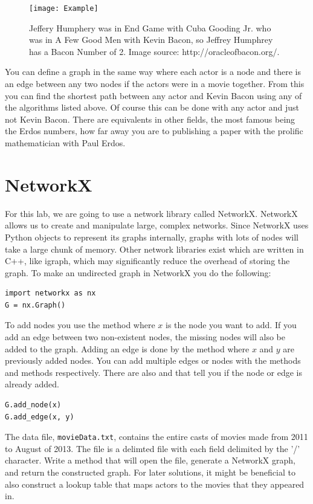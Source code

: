 \begin{figure}[h]
\texttt{[image: Example]}
\caption{Jeffery Humphery was in End Game with Cuba Gooding Jr. who was in A Few Good Men with Kevin Bacon, so Jeffrey Humphrey has a Bacon Number of 2.  Image source: http://oracleofbacon.org/.}
\end{figure}

You can define a graph in the same way where each actor is a node and there is an edge between any two nodes if the actors were in a movie together. From this you can find the shortest path between any actor and Kevin Bacon using any of the algorithms listed above. Of course this can be done with any actor and just not Kevin Bacon. There are equivalents in other fields, the most famous being the Erdos numbers, how far away you are to publishing a paper with the prolific mathematician with Paul Erdos.

\section*{NetworkX}
For this lab, we are going to use a network library called NetworkX. NetworkX allows us to create and manipulate large, complex networks.  Since NetworkX uses Python objects to represent its graphs internally, graphs with lots of nodes will take a large chunk of memory.  Other network libraries exist which are written in C++, like igraph, which may significantly reduce the overhead of storing the graph.
To make an undirected graph in NetworkX you do the following:
\begin{lstlisting}
import networkx as nx
G = nx.Graph()
\end{lstlisting}
To add nodes you use the  method where $x$ is the node you want to add.  If you add an edge between two non-existent nodes, the missing nodes will also be added to the graph. Adding an edge is done by the  method where $x$ and $y$ are previously added nodes. You can add multiple edges or nodes with the methods  and  methods respectively.  There are also  and  that tell you if the node or edge is already added.
\begin{lstlisting}
G.add_node(x)
G.add_edge(x, y)
\end{lstlisting}

\begin{problem}
The data file, \texttt{movieData.txt}, contains the entire casts of movies made from 2011 to August of 2013. The file is a delimted file with each field delimited by the '/' character.
Write a method that will open the file, generate a NetworkX graph, and return the constructed graph.
For later solutions, it might be beneficial to also construct a lookup table that maps actors to the movies that they appeared in.
\end{problem}

